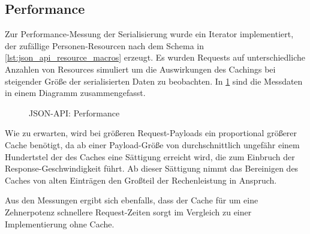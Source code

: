 \subsection{Performance}
\label{ssec:bj_performance}

Zur Performance-Messung der Serialisierung wurde ein Iterator implementiert,
der zufällige Personen-Resourcen nach dem Schema in
\cref{lst:json_api_resource_macros} erzeugt.  Es wurden Requests auf
unterschiedliche Anzahlen von Resources simuliert um die Auswirkungen des
Cachings bei steigender Größe der serialisierten Daten zu beobachten.  In
\cref{fig:json_api_performance} sind die Messdaten in einem Diagramm
zusammengefasst.

\begin{figure}
	\center
	
	\caption{JSON-API: Performance}
	\label{fig:json_api_performance}
\end{figure}

Wie zu erwarten, wird bei größeren Request-Payloads ein proportional größerer
Cache benötigt, da ab einer Payload-Größe von durchschnittlich ungefähr einem
Hundertstel der des Caches eine Sättigung erreicht wird, die zum Einbruch der
Response-Geschwindigkeit führt.  Ab dieser Sättigung nimmt das Bereinigen des
Caches von alten Einträgen den Großteil der Rechenleistung in Anspruch.

Aus den Messungen ergibt sich ebenfalls, dass der Cache für um eine
Zehnerpotenz schnellere Request-Zeiten sorgt im Vergleich zu einer
Implementierung ohne Cache.
